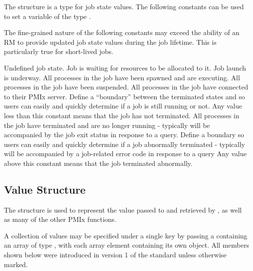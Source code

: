 The  structure is a  type for job state values. The following constants can be used to set a variable of the type .

\adviceuserstart
The fine-grained nature of the following constants may exceed the ability of an \ac{RM} to provide updated job state values during the job lifetime. This is particularly true for short-lived jobs.
\adviceuserend

\begin{constantdesc}
%
Undefined job state.
%
Job is waiting for resources to be allocated to it.
%
Job launch is underway.
%
All processes in the job have been spawned and are executing.
%
All processes in the job have been suspended.
%
All processes in the job have connected to their \ac{PMIx} server.
%
Define a ``boundary'' between the terminated states and  so users can easily and quickly determine if a job is still running or not.
Any value less than this constant means that the job has not terminated.
%
All processes in the job have terminated and are no longer running - typically will be accompanied by the job exit status in response to a query.
%
Define a boundary so users can easily and quickly determine if a job abnormally terminated - typically will be accompanied by a job-related error code in response to a query
Any value above this constant means that the job terminated abnormally.
%
\end{constantdesc}


\subsection{Value Structure}

The  structure is used to represent the value passed to  and retrieved by , as well as many of the other \ac{PMIx} functions.

A collection of values may be specified under a single key by passing a  containing an array of type , with each array element containing its own object. All members shown below were introduced in version 1 of the standard unless otherwise marked.

